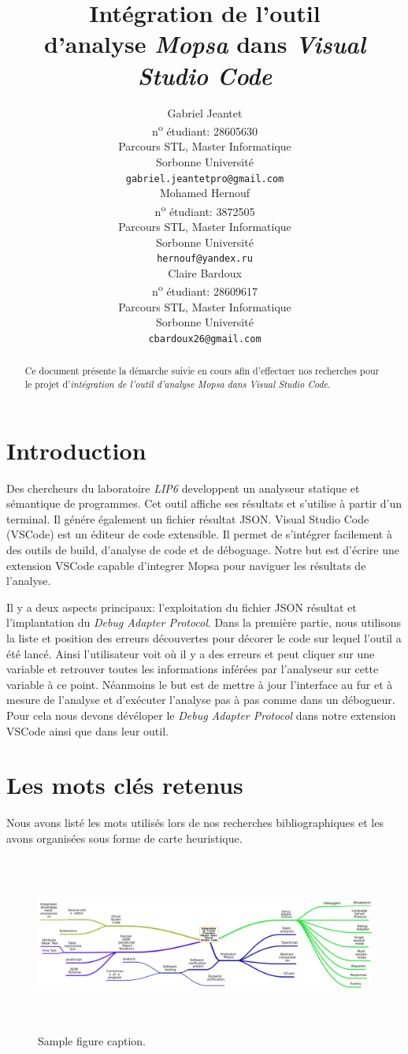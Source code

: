 \documentclass[french]{article}
\title{Intégration de l'outil \\ d'analyse  \emph{Mopsa} dans \emph{Visual Studio Code}   }
\author{
   Gabriel Jeantet \\
   n\textsuperscript{o} étudiant: 28605630 \\
   Parcours STL, Master Informatique\\
   Sorbonne Université\\
   \texttt{gabriel.jeantetpro@gmail.com} \\
    \And
   Mohamed Hernouf \\
   n\textsuperscript{o} étudiant: 3872505 \\
   Parcours STL, Master Informatique\\
   Sorbonne Université\\
   \texttt{hernouf@yandex.ru} \\
   \And
   Claire Bardoux \\
   n\textsuperscript{o} étudiant: 28609617 \\
   Parcours STL, Master Informatique\\
   Sorbonne Université\\
   \texttt{cbardoux26@gmail.com} \\
}
\date{}
\begin{document}
\maketitle

\begin{abstract}
Ce document présente la démarche suivie en cours afin d'effectuer nos recherches pour le projet d'\emph{intégration de l'outil d'analyse Mopsa dans Visual Studio Code}.
\end{abstract}


\section{Introduction}
Des chercheurs du laboratoire \emph{LIP6} developpent un analyseur statique et sémantique de programmes. Cet outil affiche ses résultats et s'utilise à partir d'un terminal. Il génére également un fichier résultat JSON. Visual Studio Code (VSCode) est un éditeur de code extensible. Il permet de s'intégrer facilement à des outils de build, d’analyse de code et de déboguage. Notre but est d'écrire une extension VSCode capable d'integrer Mopsa pour naviguer les résultats de l'analyse. 

Il y a deux aspects principaux: l'exploitation du fichier JSON résultat et l'implantation du \emph{Debug Adapter Protocol}. 
Dans la première partie, nous utilisons la liste et position des erreurs découvertes pour décorer le code sur lequel l'outil a été lancé. Ainsi l'utilisateur voit où il y a des erreurs et peut cliquer sur une variable et retrouver toutes les informations inférées par l’analyseur sur cette variable à ce point. Néanmoins le but est de mettre à jour l'interface au fur et à mesure de l'analyse et d'exécuter l'analyse pas à pas comme dans un débogueur. Pour cela nous devons dévéloper le \emph{Debug Adapter Protocol} dans notre extension VSCode ainsi que dans leur outil.  


\section{Les mots clés retenus}
Nous avons listé les mots utilisés lors de nos recherches bibliographiques et les avons organisées sous forme de carte heuristique.  \\

\begin{figure}[!b]
  \centering
  \includegraphics[width=17cm, height=5.80cm]{mindmap.png}
  \caption{Sample figure caption.}
\end{figure}
\end{document}
